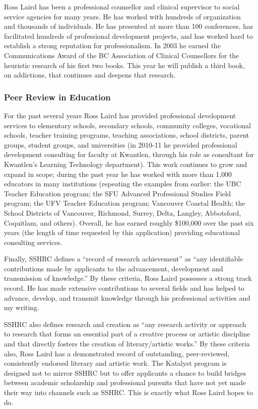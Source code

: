 \documentclass[letterpaper,10pt,headsepline]{scrreprt}
\begin{document}
Ross Laird has been a professional counsellor and clinical supervisor to
social service agencies for many years. He has worked with hundreds of
organization and thousands of individuals. He has presented at more than 100
conferences, has facilitated hundreds of professional development projects,
and has worked hard to establish a strong reputation for professionalism. In
2003 he earned the Communications Award of the BC Association of Clinical
Counsellors for the heuristic research of his first two books. This year he
will publish a third book, on addictions, that continues and deepens that
research.

\subsubsection{Peer Review in Education}

For the past several years Ross Laird has provided professional development
services to elementary schools, secondary schools, community colleges,
vocational schools, teacher training programs, teaching associations, school
districts, parent groups, student groups, and universities (in 2010-11 he
provided professional development consulting for faculty at Kwantlen, through
his role as consultant for Kwantlen's Learning Technology department). This
work continues to grow and expand in scope; during the past year he has worked
with more than 1,000 educators in many institutions (repeating the examples
from earlier: the UBC Teacher Education program; the SFU Advanced Professional
Studies Field program; the UFV Teacher Education program; Vancouver Coastal
Health; the School Districts of Vancouver, Richmond, Surrey, Delta, Langley,
Abbotsford, Coquitlam, and others). Overall, he has earned roughly \$100,000
over the past six years (the length of time requested by this application)
providing educational consulting services.

Finally, SSHRC defines a ``record of research achievement'' as ``any identifiable
contributions made by applicants to the advancement, development and
transmission of knowledge.'' By these criteria, Ross Laird possesses a strong
track record. He has made extensive contributions to several fields and has
helped to advance, develop, and transmit knowledge through his professional
activities and my writing.

SSHRC also defines research and creation as ``any research activity or approach
to research that forms an essential part of a creative process or artistic
discipline and that directly fosters the creation of literary/artistic works.''
By these criteria also, Ross Laird has a demonstrated record of outstanding,
peer-reviewed, consistently endorsed literary and artistic work. The Katalyst
program is designed not to mirror SSHRC but to offer applicants a chance to
build bridges between academic scholarship and professional pursuits that have
not yet made their way into channels such as SSHRC. This is exactly what Ross
Laird hopes to do.
\end{document}
